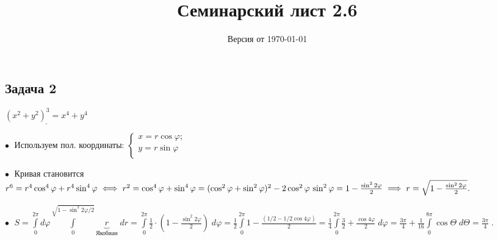 \documentclass[a4paper, fleqn]{article}
\title{Семинарский лист 2.6}
\author{
}
\date{Версия от {\ddmmyyyydate\today} \currenttime}
\begin{document}
    \maketitle
    
    
    \subsection*{Задача 2}

    $\underline{(x^2 + y^2)^3 = x^4 + y^4}$

    $\bullet \; $ Используем пол. координаты: $\begin{cases}
    x = r \cos \varphi;\\
    y = r \sin \varphi \\
    \end{cases}$


    $\bullet \; $ Кривая становится $r^6 = r^4 \cos ^4 \varphi  + r^4 \sin ^4 \varphi \iff r^2 = \cos^4 \varphi + \sin^4 \varphi = (\cos^2 \varphi + \sin^2 \varphi)^2 - 2 \cos^2 \varphi \, \sin^2 \varphi = \\ 1 - \frac{\sin^2 2 \varphi}{2} \implies r = \sqrt{1 - \frac{\sin^2 2 \varphi}{2}}.$

    $\bullet \; $ $\displaystyle S = \int\limits_{0}^{2 \pi} d \varphi \int\limits_{0}^{\sqrt{1 - \sin^2 2 \varphi/2}} \underbrace{r}_{\text{Якобиан}} \; dr = \int\limits_{0}^{2 \pi} \frac{1}{2} \cdot \left( 1 - \frac{\sin^2 2 \varphi}{2} \right) \; d \varphi = \frac{1}{2} \int \limits_{0}^{2 \pi} 1 -  \frac{(1/2 - 1/2 \cos 4 \varphi)}{2} = \frac{1}{4} \int \limits_{0}^{2 \pi} \frac{3}{2} + \frac{\cos 4 \varphi}{2} \; d \varphi  = \frac{3 \pi}{4} + \frac{1}{16} \int\limits_{0}^{8 \pi} \cos \Theta \; d \Theta =\boxed{ \frac{3 \pi}{4}} \; .$
    
    
    
    
\end{document}
